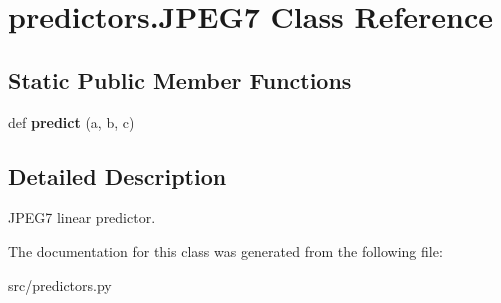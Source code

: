 \hypertarget{classpredictors_1_1JPEG7}{}\section{predictors.\+J\+P\+E\+G7 Class Reference}
\label{classpredictors_1_1JPEG7}
\subsection*{Static Public Member Functions}
\begin{DoxyCompactItemize}
\item 
\mbox{\label{classpredictors_1_1JPEG7_a49c7fe21a1f0b53ebb816618162e3f8c}} 
def {\bfseries predict} (a, b, c)
\end{DoxyCompactItemize}


\subsection{Detailed Description}
\begin{DoxyVerb}JPEG7 linear predictor.
\end{DoxyVerb}
 

The documentation for this class was generated from the following file\+:\begin{DoxyCompactItemize}
\item 
src/predictors.\+py\end{DoxyCompactItemize}
